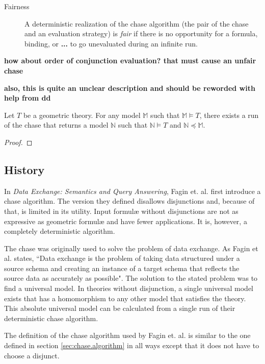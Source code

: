 		\label{fairness_definition}
		\begin{description}
		\item [Fairness] A deterministic realization of the chase algorithm
		(the pair of the chase and an evaluation strategy) is \emph{fair} if
		there is no opportunity for a formula, binding, or \textbf{...} to go
		unevaluated during an infinite run.
		\end{description}

		\textbf{how about order of conjunction evaluation? that must cause an unfair chase}

		\textbf{also, this is quite an unclear description and should be reworded with help from dd}

		\begin{theorem}
			Let $T$ be a geometric theory. For any model $\mathbb{M}$ such that
			$\mathbb{M} \models T$, there exists a run of the chase that
			returns a model $\mathbb{N}$ such that $\mathbb{N} \models T$ and
			$\mathbb{N} \preceq \mathbb{M}$.
		\end{theorem}

		\begin{proof}
		\end{proof}

	\subsection{History}

		In \cite{FKMP02} \emph{Data Exchange: Semantics and Query Answering},
		Fagin et. al. first introduce a chase algorithm. The version they
		defined disallows disjunctions and, because of that, is limited in its
		utility. Input formul{\ae} without disjunctions are not as expressive
		as geometric formul{\ae} and have fewer applications. It is, however, a
		completely deterministic algorithm.

		The chase was originally used to solve the problem of data exchange. As
		Fagin et al. states, ``Data exchange is the problem of taking data
		structured under a source schema and creating an instance of a target
		schema that reflects the source data as accurately as possible". The
		solution to the stated problem was to find a universal model. In theories
		without disjunction, a single universal model exists that has a
		homomorphism to any other model that satisfies the theory. This
		absolute universal model can be calculated from a single run of their
		deterministic chase algorithm.

		The definition of the chase algorithm used by Fagin et. al. is similar
		to the one defined in section \ref{sec:chase.algorithm} in all ways
		except that it does not have to choose a disjunct.

